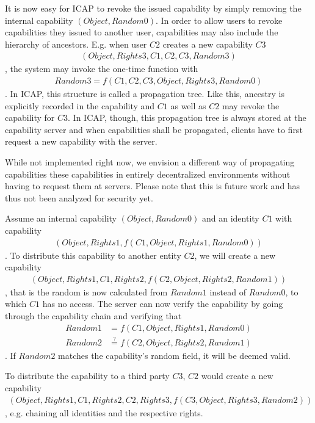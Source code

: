 It is now easy for ICAP to revoke the issued capability by simply removing the internal capability $(Object, Random0)$.
In order to allow users to revoke capabilities they issued to another user, capabilities may also include the hierarchy of ancestors.
E.g. when user $C2$ creates a new capability $C3$
\begin{align*}
    (Object, Rights3, C1, C2, C3, Random3)
\end{align*},
the system may invoke the one-time function with
\begin{align*}
    Random3 = f(C1, C2, C3, Object, Rights3, Random0)
\end{align*}.
In ICAP, this structure is called a propagation tree.
Like this, ancestry is explicitly recorded in the capability and $C1$ as well as $C2$ may revoke the capability for $C3$.
In ICAP, though, this propagation tree is always stored at the capability server and when capabilities shall be propagated, clients have to first request a new capability with the server.

While not implemented right now, we envision a different way of propagating capabilities these capabilities in entirely decentralized environments without having to request them at servers.
Please note that this is future work and has thus not been analyzed for security yet.

Assume an internal capability $(Object, Random0)$ and an identity $C1$ with capability
\begin{align*}
    (Object, Rights1, f(C1, Object, Rights1, Random0))
\end{align*}.
To distribute this capability to another entity $C2$, we will create a new capability
\begin{align*}
    (Object, Rights1, C1, Rights2, f(C2, Object, Rights2, Random1))
\end{align*}, that is the random is now calculated from $Random1$ instead of $Random0$, to which $C1$ has no access.
The server can now verify the capability by going through the capability chain and verifying that
\begin{align*}
    Random1 &= f(C1, Object, Rights1, Random0)\\
    Random2 &\stackrel{?}{=} f(C2, Object, Rights2, Random1)
\end{align*}.
If $Random2$ matches the capability's random field, it will be deemed valid.

To distribute the capability to a third party $C3$, $C2$ would create a new capability
\begin{align*}
    (Object, Rights1, C1, Rights2, C2, Rights3, f(C3, Object, Rights3, Random2))
\end{align*}, e.g. chaining all identities and the respective rights.

